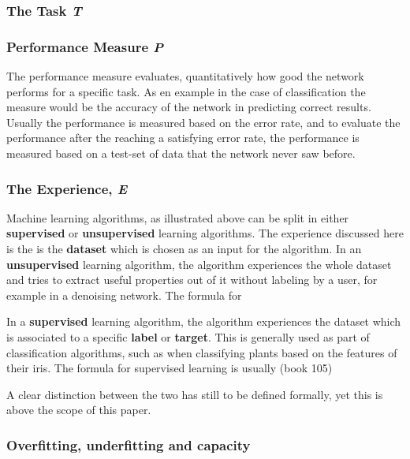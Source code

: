 \documentclass{article}
\begin{document}
\subsubsection{The Task \textit{T}}
\label{subsub:task}


\subsubsection{Performance Measure \textit{P}}
\label{subsub:performance_measure}

The performance measure evaluates, quantitatively how good the network performs for a specific task. As en example in the case of classification the measure would be the accuracy of the network in predicting correct results. Usually the performance is measured based on the error rate, and to evaluate the performance after the reaching a satisfying error rate, the performance is measured based on a test-set of data that the network never saw before.

\subsubsection{The Experience, \textit{E}}
\label{subsub:the_experience}

Machine learning algorithms, as illustrated above can be split in either \textbf{supervised} or \textbf{unsupervised} learning algorithms. The experience discussed here is the is the \textbf{dataset} which is chosen as an input for the algorithm. In an \textbf{unsupervised} learning algorithm, the algorithm experiences the whole dataset and tries to extract useful properties out of it without labeling by a user, for example in a denoising network. The formula for 

In a \textbf{supervised} learning algorithm, the algorithm experiences the dataset which is associated to a specific \textbf{label} or \textbf{target}. This is generally used as part of classification algorithms, such as when classifying plants based on the features of their iris. The formula for supervised learning is usually (book 105)

A clear distinction between the two has still to be defined formally, yet this is above the scope of this paper.

\subsubsection{Overfitting, underfitting and capacity}
\label{subsub:overfitting}
\end{document}
